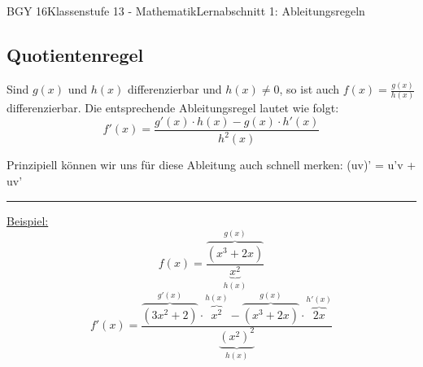 \documentclass[11pt,twocolumn,oneside,openany,headings=optiontotoc,11pt,numbers=noenddot]{article}
\begin{document}
\begin{worksheet}{BGY 16}{Klassenstufe 13 - Mathematik}{Lernabschnitt 1: Ableitungsregeln}
\begin{framed}
			\subsection{Quotientenregel}
			Sind \(g(x)\) und \(h(x)\) differenzierbar und \underline{\(h(x)\neq{}0\)}, so ist auch \colorbox{green!10}{\(f(x) = \frac{g(x)}{h(x)}\)} differenzierbar. Die entsprechende Ableitungsregel lautet wie folgt: \[f'(x) = \frac{g'(x)\cdot{}h(x) - g(x)\cdot{}h'(x)}{h^2(x)}\]
			\par\noindent
			Prinzipiell können wir uns für diese Ableitung auch schnell merken: (uv)' = u'v + uv'
			\par\bigskip\noindent
			\rule{0.99\textwidth}{0.4pt}
			\underline{Beispiel:}\[f(x) = \frac{\overbrace{(x^3+2x)}^{g(x)}}{\underbrace{x^2}_{h(x)}}\]\[f'(x) = \frac{\overbrace{(3x^2+2)}^{g'(x)}\cdot\overbrace{x^2}^{h(x)} - \overbrace{(x^3+2x)}^{g(x)}\cdot\overbrace{2x}^{h'(x)}}{\underbrace{(x^2)^2}_{h(x)}}\]
		\end{framed}
	\end{worksheet}
\end{document}
